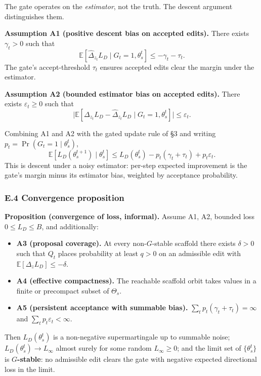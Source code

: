 \documentclass[
]{article}
\providecommand{\tightlist}{%
  \setlength{\itemsep}{0pt}\setlength{\parskip}{0pt}}
\begin{document}
The gate operates on the \emph{estimator}, not the truth. The descent
argument distinguishes them.

\textbf{Assumption A1 (positive descent bias on accepted edits).} There
exists \(\gamma_t > 0\) such that
\[\mathbb{E}\!\left[\widehat{\Delta}_{z_t} L_D \mid G_t = 1, \theta_s^t\right] \leq -\gamma_t - \tau_t.\]
The gate's accept-threshold \(\tau_t\) ensures accepted edits clear the
margin under the estimator.

\textbf{Assumption A2 (bounded estimator bias on accepted edits).} There
exists \(\varepsilon_t \geq 0\) such that
\[\big|\mathbb{E}\!\left[\Delta_{z_t} L_D - \widehat{\Delta}_{z_t} L_D \mid G_t = 1, \theta_s^t\right]\big| \leq \varepsilon_t.\]

Combining A1 and A2 with the gated update rule of §3 and writing
\(p_t = \Pr(G_t = 1 \mid \theta_s^t)\),
\[\mathbb{E}\!\left[L_D(\theta_s^{t+1}) \mid \theta_s^t\right] \leq L_D(\theta_s^t) - p_t(\gamma_t + \tau_t) + p_t \varepsilon_t.\]
This is descent under a noisy estimator: per-step expected improvement
is the gate's margin minus its estimator bias, weighted by acceptance
probability.

\subsubsection{E.4 Convergence
proposition}\label{e.4-convergence-proposition}

\textbf{Proposition (convergence of loss, informal).} Assume A1, A2,
bounded loss \(0 \leq L_D \leq B\), and additionally:

\begin{itemize}
\tightlist
\item
  \textbf{A3 (proposal coverage).} At every non-\(G\)-stable scaffold
  there exists \(\delta > 0\) such that \(Q_t\) places probability at
  least \(q > 0\) on an admissible edit with
  \(\mathbb{E}[\Delta_z L_D] \leq -\delta\).
\item
  \textbf{A4 (effective compactness).} The reachable scaffold orbit
  takes values in a finite or precompact subset of \(\Theta_s\).
\item
  \textbf{A5 (persistent acceptance with summable bias).}
  \(\sum_t p_t (\gamma_t + \tau_t) = \infty\) and
  \(\sum_t p_t \varepsilon_t < \infty\).
\end{itemize}

Then \(L_D(\theta_s^t)\) is a non-negative supermartingale up to
summable noise; \(L_D(\theta_s^t) \to L_\infty\) almost surely for some
random \(L_\infty \geq 0\); and the limit set of \(\{\theta_s^t\}\) is
\textbf{\(G\)-stable}: no admissible edit clears the gate with negative
expected directional loss in the limit.
\end{document}
